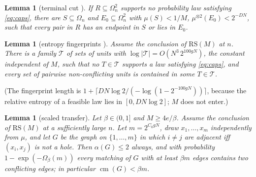 \documentclass[11pt]{article}
\newtheorem{lemma}[theorem]{Lemma}
\theoremstyle{definition}\newtheorem{conjecture}[theorem]{Conjecture}
\theoremstyle{remark}\newtheorem{remark}[theorem]{Remark}
\newcommand{\cm}{\operatorname{cm}}
\newcommand{\RS}{\mathrm{RS}}
\begin{document}
\begin{lemma}[terminal cut {\cite[lem:terminal-cut]{OAIH}}]\label{l:cut}
If $R\subseteq\Omega_n^2$ supports no probability law satisfying \eqref{eq:caps}, there are $S\subseteq\Omega_n$ and
$E_0\subseteq\Omega_n^2$ with $\mu(S)<1/M$, $\mu^{\otimes2}(E_0)<2^{-DN}$, such that every pair in $R$ has an endpoint
in $S$ or lies in $E_0$.
\end{lemma}

\begin{lemma}[entropy fingerprints {\cite[proof of prop:raw-to-graph]{OAIH}}]\label{l:fp}
Assume the conclusion of $\RS(M)$ at $n$. There is a family $\mathcal T$ of sets of units with
$\log|\mathcal T|=O(N^3\,2^{100gN})$, the constant independent of $M$, such that no $T\in\mathcal T$ supports a law
satisfying \eqref{eq:caps}, and every set of pairwise non-conflicting units is contained in some $T\in\mathcal T$.
\end{lemma}
\noindent (The fingerprint length is $1+\lceil DN\log2/(-\log(1-2^{-100gN}))\rceil$, because the relative entropy of a
feasible law lies in $[0,DN\log2]$; $M$ does not enter.)

\begin{lemma}[scaled transfer]\label{l:transfer}
Let $\beta\in(0,1]$ and $M\ge4e/\beta$. Assume the conclusion of $\RS(M)$ at a sufficiently large $n$. Let $m=2^{C_0gN}$, draw
$x_1,\dots,x_m$ independently from $\mu$, and let $G$ be the graph on $\{1,\dots,m\}$ in which $i\ne j$ are adjacent iff
$(x_i,x_j)$ is not a hole. Then $\alpha(G)\le2$ always, and with probability $1-\exp(-\Omega_\beta(m))$ every matching of
$G$ with at least $\beta m$ edges contains two conflicting edges; in particular $\cm(G)<\beta m$.
\end{lemma}
\end{document}
